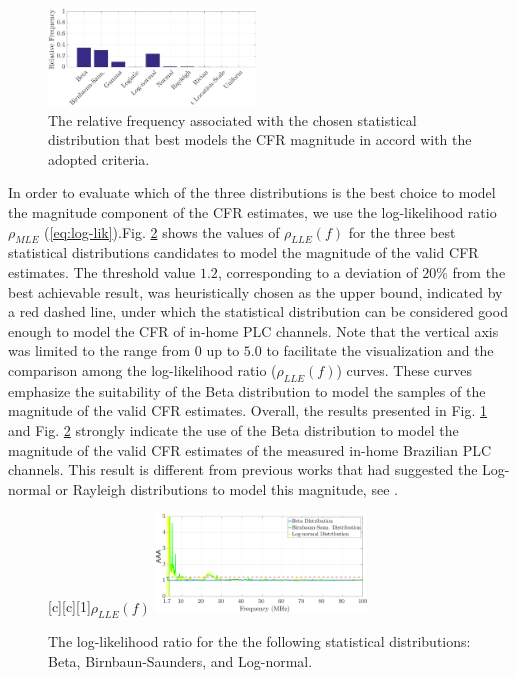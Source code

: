 \documentclass[journal]{IEEEtran}
\begin{document}
\begin{figure}[h!]
	\centering
	\includegraphics[width=0.49\textwidth]{images/Mag_percent.eps}
	\caption{The relative frequency associated with the chosen statistical distribution that best models the \ac{CFR} magnitude in accord with the adopted criteria.}
	\label{MAG_percent}
\end{figure}

In order to evaluate which of the three distributions is the best choice to model the magnitude component of the \ac{CFR} estimates, we use the log-likelihood ratio $\rho_{MLE}$ (\ref{eq:log-lik}).Fig. \ref{fig:Log_like} shows the values of  $\rho_{LLE}(f)$ for the three best statistical distributions candidates to model the magnitude of the valid \ac{CFR} estimates. The threshold value $1.2$, corresponding to a deviation of $20\%$ from the best achievable result, was heuristically chosen as the upper bound, indicated by a red dashed line, under which the statistical distribution can be considered good enough to model the \ac{CFR} of in-home \ac{PLC} channels. Note that the vertical axis was limited to the range from $0$ up to $5.0$ to facilitate the visualization and the comparison among the log-likelihood ratio ($\rho_{LLE} (f)$) curves. These curves emphasize the suitability of the Beta distribution to model the samples of the magnitude of the valid \ac{CFR} estimates. Overall, the results presented in Fig. \ref{MAG_percent} and Fig. \ref{fig:Log_like} strongly indicate the use of the Beta distribution to model the magnitude of the valid \ac{CFR} estimates of the measured in-home Brazilian \ac{PLC} channels. This result is different from previous works that had suggested the Log-normal or Rayleigh distributions to model this magnitude, see \cite{Galli:Wireline,RayleighPLC}.

\begin{figure}[h!]
	\centering
	[c][1]{$\rho_{LLE} (f)$}
	\includegraphics[width=0.5\textwidth]{images/LLH_BETA_BIRN_LogN_1.7.eps}
	\caption{The log-likelihood ratio for the the following statistical distributions: Beta, Birnbaun-Saunders, and Log-normal.}
	\label{fig:Log_like}
\end{figure}
\end{document}
